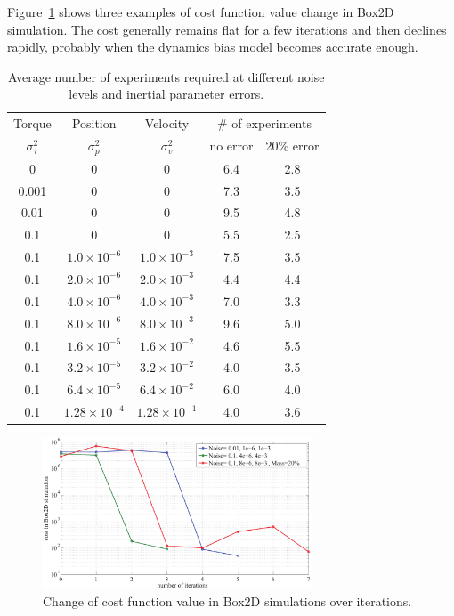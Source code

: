 Figure~\ref{fig:learning_cost-iteration} shows three examples of cost function
value change in Box2D simulation.
The cost generally remains flat for a few iterations and then declines
rapidly, probably when the dynamics bias model becomes accurate enough.

\begin{table}
\begin{center}
\caption{Average number of experiments required at different noise
 levels and inertial parameter errors.} \label{tab:learning_exp-noise}
\begin{tabular}{c|c|c|c|c}
\hline
Torque & Position & Velocity & 
\multicolumn{2}{c}{\# of experiments}\\\cline{4-5}
$\sigma_{\tau}^2$ & $\sigma_p^2$ & $\sigma_v^2$ & 
{\footnotesize no error} &
{\footnotesize 20\% error} \\\hline
0 & 0 & 0 & 6.4 & 2.8 \\
0.001 & 0 & 0 & 7.3 & 3.5 \\
0.01 & 0 & 0 & 9.5 & 4.8 \\
0.1 & 0 & 0 & 5.5 & 2.5 \\\hline
0.1 & $1.0\times 10^{-6}$ & $1.0\times 10^{-3}$ & 7.5 & 3.5 \\
0.1 & $2.0\times 10^{-6}$ & $2.0\times 10^{-3}$ & 4.4 & 4.4 \\
0.1 & $4.0\times 10^{-6}$ & $4.0\times 10^{-3}$ & 7.0 & 3.3 \\
0.1 & $8.0\times 10^{-6}$ & $8.0\times 10^{-3}$ & 9.6 & 5.0 \\
0.1 & $1.6\times 10^{-5}$ & $1.6\times 10^{-2}$ & 4.6 & 5.5 \\
0.1 & $3.2\times 10^{-5}$ & $3.2\times 10^{-2}$ & 4.0 & 3.5 \\
0.1 & $6.4\times 10^{-5}$ & $6.4\times 10^{-2}$ & 6.0 & 4.0 \\
0.1 & $1.28\times 10^{-4}$ & $1.28\times 10^{-1}$ & 4.0 & 3.6 \\\hline
\end{tabular}
\end{center}
\end{table}

\begin{figure}[tb]
\begin{center}
\includegraphics[width=80mm]{eps/cost_iteration.pdf}
\caption{Change of cost function value in Box2D simulations over
 iterations.}
\label{fig:learning_cost-iteration}
\end{center}
\end{figure}

